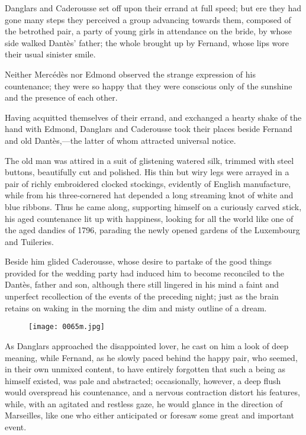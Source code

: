 Danglars and Caderousse set off upon their errand at full speed; but
ere they had gone many steps they perceived a group advancing towards
them, composed of the betrothed pair, a party of young girls in
attendance on the bride, by whose side walked Dantès’ father; the whole
brought up by Fernand, whose lips wore their usual sinister smile.

Neither Mercédès nor Edmond observed the strange expression of his
countenance; they were so happy that they were conscious only of the
sunshine and the presence of each other.

Having acquitted themselves of their errand, and exchanged a hearty
shake of the hand with Edmond, Danglars and Caderousse took their
places beside Fernand and old Dantès,—the latter of whom attracted
universal notice.

The old man was attired in a suit of glistening watered silk, trimmed
with steel buttons, beautifully cut and polished. His thin but wiry
legs were arrayed in a pair of richly embroidered clocked stockings,
evidently of English manufacture, while from his three-cornered hat
depended a long streaming knot of white and blue ribbons. Thus he came
along, supporting himself on a curiously carved stick, his aged
countenance lit up with happiness, looking for all the world like one
of the aged dandies of 1796, parading the newly opened gardens of the
Luxembourg and Tuileries.

Beside him glided Caderousse, whose desire to partake of the good
things provided for the wedding party had induced him to become
reconciled to the Dantès, father and son, although there still lingered
in his mind a faint and unperfect recollection of the events of the
preceding night; just as the brain retains on waking in the morning the
dim and misty outline of a dream.

\begin{figure}[ht]
\texttt{[image: 0065m.jpg]}
\end{figure}

As Danglars approached the disappointed lover, he cast on him a look of
deep meaning, while Fernand, as he slowly paced behind the happy pair,
who seemed, in their own unmixed content, to have entirely forgotten
that such a being as himself existed, was pale and abstracted;
occasionally, however, a deep flush would overspread his countenance,
and a nervous contraction distort his features, while, with an agitated
and restless gaze, he would glance in the direction of Marseilles, like
one who either anticipated or foresaw some great and important event.


